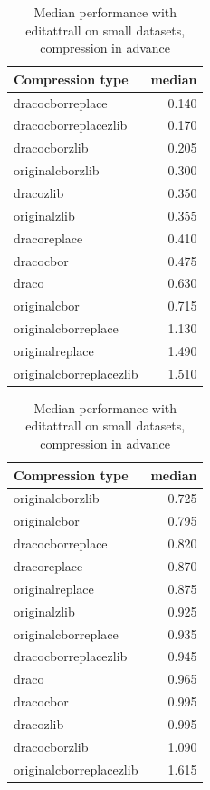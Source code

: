   \begin{table}[!h]
    \begin{minipage}{.5\linewidth}
      \caption{
Median performance with editattrall on large datasets, compression in advance}
\centering

\begin{tabular}{|l|r|}
\hline
Compression type & median\\
\hline
dracocborreplace & 0.140\\
\hline
dracocborreplacezlib & 0.170\\
\hline
dracocborzlib & 0.205\\
\hline
originalcborzlib & 0.300\\
\hline
dracozlib & 0.350\\
\hline
originalzlib & 0.355\\
\hline
dracoreplace & 0.410\\
\hline
dracocbor & 0.475\\
\hline
draco & 0.630\\
\hline
originalcbor & 0.715\\
\hline
originalcborreplace & 1.130\\
\hline
originalreplace & 1.490\\
\hline
originalcborreplacezlib & 1.510\\
\hline
\end{tabular}
\end{minipage}%
    \begin{minipage}{.5\linewidth}
      \centering
        \caption{
Median performance with editattrall on small datasets, compression in advance}

\begin{tabular}{|l|r|}
\hline
Compression type & median\\
\hline
originalcborzlib & 0.725\\
\hline
originalcbor & 0.795\\
\hline
dracocborreplace & 0.820\\
\hline
dracoreplace & 0.870\\
\hline
originalreplace & 0.875\\
\hline
originalzlib & 0.925\\
\hline
originalcborreplace & 0.935\\
\hline
dracocborreplacezlib & 0.945\\
\hline
draco & 0.965\\
\hline
dracocbor & 0.995\\
\hline
dracozlib & 0.995\\
\hline
dracocborzlib & 1.090\\
\hline
originalcborreplacezlib & 1.615\\
\hline
\end{tabular}
\end{minipage} 
\end{table}

